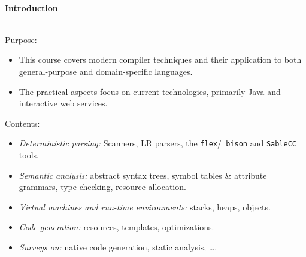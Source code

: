 


 

\begin{slide*}
\begin{tabbing}

~\\
{\Huge\bf Introduction}\\~\\
\end{tabbing}

\begin{center}
\end{center}
\end{slide*}

\begin{slide*}
Purpose:
\begin{itemize}
\item This course covers modern compiler techniques and their application to both
general-purpose and domain-specific languages.

\item The practical aspects focus on current technologies, primarily
  Java and interactive web services.
\end{itemize}
\vfil
\end{slide*}
 
\begin{slide*}
Contents:
\begin{itemize}\itemsep=0mm
\item {\em Deterministic parsing:\/} Scanners, LR parsers, the {\tt flex}/{\tt
  bison} and {\tt SableCC} tools.
\item {\em Semantic analysis:\/} abstract syntax trees, symbol tables \&
attribute grammars, type checking, resource allocation.
\item {\em Virtual machines and run-time environments:\/} stacks, heaps, objects.
\item {\em Code generation:\/} resources, templates, optimizations.
\item {\em Surveys on:\/} native code generation, static analysis, \ldots.
\end{itemize}
\vfil
\end{slide*}
 
